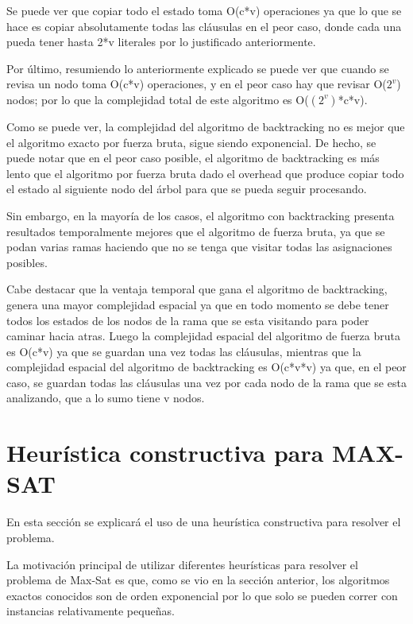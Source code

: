 \documentclass[a4paper,10pt]{article}
\begin{document}
Se puede ver que copiar todo el estado toma O(c*v) operaciones ya que lo que se hace es copiar absolutamente todas las cl\'ausulas en el peor caso, donde cada una pueda tener hasta 2*v literales por lo justificado anteriormente.

Por \'ultimo, resumiendo lo anteriormente explicado se puede ver que cuando se revisa un nodo toma O(c*v) operaciones, y en el peor caso hay que revisar O($2^{v}$) nodos; por lo que la complejidad total de este algoritmo es O($(2^{v})$*c*v).

Como se puede ver, la complejidad del algoritmo de backtracking no es mejor que el algoritmo exacto por fuerza bruta, sigue siendo exponencial. De hecho, se puede notar que en el peor caso posible, el algoritmo de backtracking es m\'as lento que el algoritmo por fuerza bruta dado el overhead que produce copiar todo el estado al siguiente nodo del \'arbol para que se pueda seguir procesando.

Sin embargo, en la mayor\'ia de los casos, el algoritmo con backtracking presenta resultados temporalmente mejores que el algoritmo de fuerza bruta, ya que se podan varias ramas haciendo que no se tenga que visitar todas las asignaciones posibles.

\medskip

Cabe destacar que la ventaja temporal que gana el algoritmo de backtracking, genera una mayor complejidad espacial ya que en todo momento se debe tener todos los estados de los nodos de la rama que se esta visitando para poder caminar hacia atras. Luego la complejidad espacial del algoritmo de fuerza bruta es O(c*v) ya que se guardan una vez todas las cl\'ausulas, mientras que la complejidad espacial del algoritmo de backtracking es O(c*v*v) ya que, en el peor caso, se guardan todas las cl\'ausulas una vez por cada nodo de la rama que se esta analizando, que a lo sumo tiene v nodos.




\section*{Heur\'istica constructiva para MAX-SAT}
En esta secci\'on se explicar\'a el uso de una heur\'istica constructiva para resolver el problema.

La motivaci\'on principal de utilizar diferentes heur\'isticas para resolver el problema de Max-Sat es que, como se vio en la secci\'on anterior, los algoritmos exactos conocidos son de orden exponencial por lo que solo se pueden correr con instancias relativamente peque\~{n}as.
\end{document}
